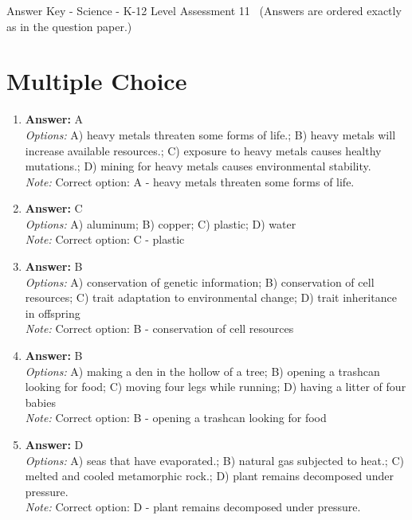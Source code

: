 \documentclass[12pt]{article}
\begin{document}
\begin{center}
Answer Key - Science - K-12 Level Assessment 11 \
\small (Answers are ordered exactly as in the question paper.)
\end{center}

\section*{Multiple Choice}
\begin{enumerate}[label=\arabic*.]
\item \textbf{Answer:} A
\\ \textit{Options:} A) heavy metals threaten some forms of life.; B) heavy metals will increase available resources.; C) exposure to heavy metals causes healthy mutations.; D) mining for heavy metals causes environmental stability.
\\ \textit{Note:} Correct option: A - heavy metals threaten some forms of life.
\item \textbf{Answer:} C
\\ \textit{Options:} A) aluminum; B) copper; C) plastic; D) water
\\ \textit{Note:} Correct option: C - plastic
\item \textbf{Answer:} B
\\ \textit{Options:} A) conservation of genetic information; B) conservation of cell resources; C) trait adaptation to environmental change; D) trait inheritance in offspring
\\ \textit{Note:} Correct option: B - conservation of cell resources
\item \textbf{Answer:} B
\\ \textit{Options:} A) making a den in the hollow of a tree; B) opening a trashcan looking for food; C) moving four legs while running; D) having a litter of four babies
\\ \textit{Note:} Correct option: B - opening a trashcan looking for food
\item \textbf{Answer:} D
\\ \textit{Options:} A) seas that have evaporated.; B) natural gas subjected to heat.; C) melted and cooled metamorphic rock.; D) plant remains decomposed under pressure.
\\ \textit{Note:} Correct option: D - plant remains decomposed under pressure.
\end{enumerate}
\end{document}
